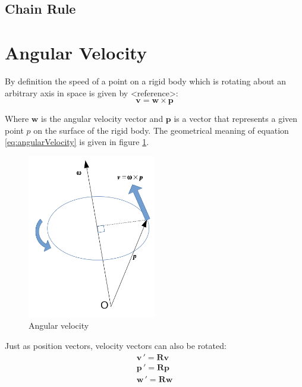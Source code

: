 \documentclass[a4paper]{report}
\begin{document}
\subsection{Chain Rule}


\section{Angular Velocity}
By definition the speed of a point on a rigid body which is rotating about an
arbitrary axis in space is given by <reference>:
\begin{equation}
    \boldsymbol{v} = \boldsymbol{w} \times \boldsymbol{p} \label{eq:angularVelocity}
\end{equation}

Where $\boldsymbol{w}$ is the angular velocity vector and $\boldsymbol{p}$ is a
vector that represents a given point $p$ on the surface of the rigid body. The
geometrical meaning of equation \eqref{eq:angularVelocity} is given in figure
\ref{fig:rotation_velocity}.

\begin{figure}[htb!]
\begin{center}
    \includegraphics[width=0.5\textwidth]{./resources/rotational_speed.png}
    \caption{Angular velocity}
    \label{fig:rotation_velocity}
\end{center}
\end{figure}


Just as position vectors, velocity vectors can also be rotated:
\begin{equation}
\begin{split}
    \boldsymbol{v}\,' = \boldsymbol{R} \boldsymbol{v} \\
    \boldsymbol{p}\,' = \boldsymbol{R} \boldsymbol{p} \\
    \boldsymbol{w}\,' = \boldsymbol{R} \boldsymbol{w}
\end{split}
\end{equation}
\end{document}
